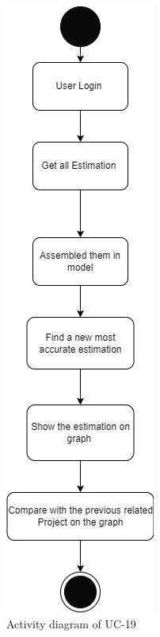 \begin{figure}[H]
    \centering
    \includegraphics[scale=0.7]{./diagrams/Activity Diagram/ad-19.png}
    \caption{Activity diagram of UC-19}
    \label{fig:act-19}

\end{figure}


